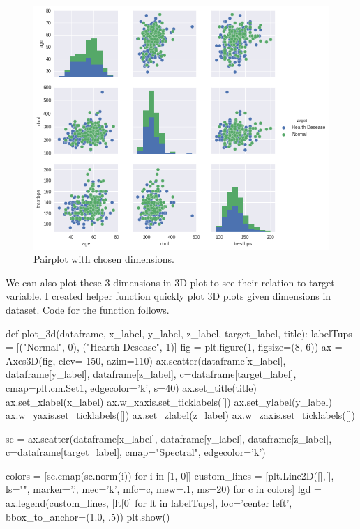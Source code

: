 \documentclass[12pt]{article}
\begin{document}
\begin{figure}[H]
    \centering
    \includegraphics[width=\textwidth]{img/pairplot.png}
    \caption{Pairplot with chosen dimensions.}
\end{figure}
 
We can also plot these 3 dimensions in 3D plot to see their relation to target variable. I created helper function quickly plot 3D plots given dimensions in dataset. Code for the function follows.

\begin{python}
    def plot_3d(dataframe, x_label, y_label, z_label, target_label, title):
        labelTups = [("Normal", 0), ("Hearth Desease", 1)]
        fig = plt.figure(1, figsize=(8, 6))
        ax = Axes3D(fig, elev=-150, azim=110)
        ax.scatter(dataframe[x_label], dataframe[y_label], dataframe[z_label], c=dataframe[target_label],
                    cmap=plt.cm.Set1, edgecolor='k', s=40)
        ax.set_title(title)
        ax.set_xlabel(x_label)
        ax.w_xaxis.set_ticklabels([])
        ax.set_ylabel(y_label)
        ax.w_yaxis.set_ticklabels([])
        ax.set_zlabel(z_label)
        ax.w_zaxis.set_ticklabels([])

        sc = ax.scatter(dataframe[x_label], dataframe[y_label], dataframe[z_label], c=dataframe[target_label], cmap="Spectral", edgecolor='k')

        colors = [sc.cmap(sc.norm(i)) for i in [1, 0]]
        custom_lines = [plt.Line2D([],[], ls="", marker='.', 
                        mec='k', mfc=c, mew=.1, ms=20) for c in colors]
        lgd = ax.legend(custom_lines, [lt[0] for lt in labelTups], 
                    loc='center left', bbox_to_anchor=(1.0, .5))
        plt.show()
\end{python}
\end{document}
